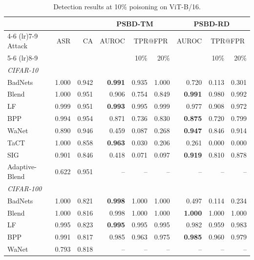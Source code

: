 \begin{table}[htbp]
\centering
\small
\setlength{\tabcolsep}{4pt}
\caption{Detection results at 10\% poisoning on ViT-B/16.}
\label{tab:results-rate-10}
\begin{tabular}{lrrrrrrrr}
\toprule
 & & & \multicolumn{3}{c}{PSBD-TM} & \multicolumn{3}{c}{PSBD-RD} \\
\cmidrule(lr){4-6} \cmidrule(lr){7-9}
Attack & ASR & CA & AUROC & \multicolumn{2}{c}{TPR@FPR} & AUROC & \multicolumn{2}{c}{TPR@FPR} \\
\cmidrule(lr){5-6} \cmidrule(lr){8-9}
 & & & & 10\% & 20\% & & 10\% & 20\% \\
\midrule
\multicolumn{9}{l}{\textit{CIFAR-10}} \\
BadNets & 1.000 & 0.942 & \textbf{0.991} & 0.935 & 1.000 & 0.720 & 0.113 & 0.301 \\
Blend & 1.000 & 0.951 & 0.906 & 0.754 & 0.849 & \textbf{0.991} & 0.980 & 0.992 \\
LF & 0.999 & 0.951 & \textbf{0.993} & 0.995 & 0.999 & 0.977 & 0.908 & 0.972 \\
BPP & 0.994 & 0.954 & 0.871 & 0.736 & 0.830 & \textbf{0.875} & 0.720 & 0.799 \\
WaNet & 0.890 & 0.946 & 0.459 & 0.087 & 0.268 & \textbf{0.947} & 0.846 & 0.914 \\
TaCT & 1.000 & 0.858 & \textbf{0.963} & 0.030 & 0.206 & 0.261 & 0.000 & 0.000 \\
SIG & 0.901 & 0.846 & 0.418 & 0.071 & 0.097 & \textbf{0.919} & 0.810 & 0.878 \\
Adaptive-Blend & 0.622 & 0.951 & -- & -- & -- & -- & -- & -- \\
\midrule
\multicolumn{9}{l}{\textit{CIFAR-100}} \\
BadNets & 1.000 & 0.821 & \textbf{0.998} & 1.000 & 1.000 & 0.497 & 0.114 & 0.234 \\
Blend & 1.000 & 0.816 & 0.998 & 1.000 & 1.000 & \textbf{1.000} & 1.000 & 1.000 \\
LF & 0.995 & 0.823 & \textbf{0.995} & 0.995 & 0.995 & 0.982 & 0.959 & 0.983 \\
BPP & 0.991 & 0.817 & 0.985 & 0.963 & 0.975 & \textbf{0.985} & 0.960 & 0.979 \\
WaNet & 0.793 & 0.818 & -- & -- & -- & -- & -- & -- \\

\end{tabular}
\end{table}
